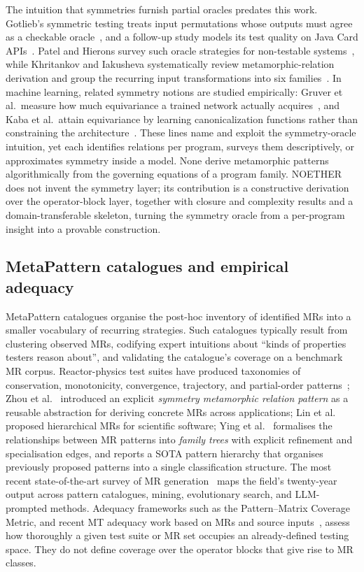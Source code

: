 \documentclass[manuscript]{acmart}
\begin{document}
The intuition that symmetries furnish partial oracles predates this work. Gotlieb's symmetric testing treats input permutations whose outputs must agree as a checkable oracle~\cite{Gotlieb2003Symmetries}, and a follow-up study models its test quality on Java Card APIs~\cite{GotliebBernard2006}. Patel and Hierons survey such oracle strategies for non-testable systems~\cite{PatelHierons2018}, while Khritankov and Iakusheva systematically review metamorphic-relation derivation and group the recurring input transformations into six families~\cite{KhritankovIakusheva2024}. In machine learning, related symmetry notions are studied empirically: Gruver et al.\ measure how much equivariance a trained network actually acquires~\cite{Gruver2023LieDerivative}, and Kaba et al.\ attain equivariance by learning canonicalization functions rather than constraining the architecture~\cite{Kaba2023Canonicalization}. These lines name and exploit the symmetry-oracle intuition, yet each identifies relations per program, surveys them descriptively, or approximates symmetry inside a model. None derive metamorphic patterns algorithmically from the governing equations of a program family. NOETHER does not invent the symmetry layer; its contribution is a constructive derivation over the operator-block layer, together with closure and complexity results and a domain-transferable skeleton, turning the symmetry oracle from a per-program insight into a provable construction.

\subsection{MetaPattern catalogues and empirical adequacy}

MetaPattern catalogues organise the post-hoc inventory of identified MRs into a smaller vocabulary of recurring strategies. Such catalogues typically result from clustering observed MRs, codifying expert intuitions about ``kinds of properties testers reason about'', and validating the catalogue's coverage on a benchmark MR corpus. Reactor-physics test suites have produced taxonomies of conservation, monotonicity, convergence, trajectory, and partial-order patterns~\cite{BellGlasstone1970, LewisMiller1993}; Zhou et al.~\cite{Zhou2020SymmetryMRP} introduced an explicit \emph{symmetry metamorphic relation pattern} as a reusable abstraction for deriving concrete MRs across applications; Lin et al.~\cite{Lin2018HierarchicalMR} proposed hierarchical MRs for scientific software; Ying et al.~\cite{Ying2025MRPatterns} formalises the relationships between MR patterns into \emph{family trees} with explicit refinement and specialisation edges, and reports a SOTA pattern hierarchy that organises previously proposed patterns into a single classification structure. The most recent state-of-the-art survey of MR generation~\cite{LiTOSEM2025} maps the field's twenty-year output across pattern catalogues, mining, evolutionary search, and LLM-prompted methods. Adequacy frameworks such as the Pattern--Matrix Coverage Metric, and recent MT adequacy work based on MRs and source inputs~\cite{Fu2024MTAdequacy}, assess how thoroughly a given test suite or MR set occupies an already-defined testing space. They do not define coverage over the operator blocks that give rise to MR classes.
\end{document}
